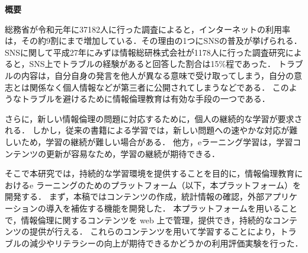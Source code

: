\begin{center}
{\bf \Large 概要}
\end{center}

総務省が令和元年に37182人に行った調査によると，インターネットの利用率は，その約9割にまで増加している\cite{soumu}．その理由の1つにSNSの普及が挙げられる．
SNSに関して平成27年にみずほ情報総研株式会社が1178人に行った調査研究\cite{mizuho}によると，SNS上でトラブルの経験があると回答した割合は15\%程であった．
トラブルの内容は，自分自身の発言を他人が異なる意味で受け取ってしまう，自分の意志とは関係なく個人情報などが第三者に公開されてしまうなどである．
このようなトラブルを避けるために情報倫理教育は有効な手段の一つである\cite{moraru}．

さらに，新しい情報倫理の問題に対応するために，個人の継続的な学習が要求される\cite{fluency}．
しかし，従来の書籍による学習では，新しい問題への速やかな対応が難しいため，学習の継続が難しい場合がある．
他方，eラーニング学習は，学習コンテンツの更新が容易なため，学習の継続が期待できる\cite{chieru}．

そこで本研究では，持続的な学習環境を提供することを目的に，情報倫理教育におけるe ラーニングのためのプラットフォーム（以下，本プラットフォーム）を開発する．
まず，本稿ではコンテンツの作成，統計情報の確認，外部アプリケーションの導入を補佐する機能を開発した．
本プラットフォームを用いることで，情報倫理に関するコンテンツを web 上で管理，提供でき，持続的なコンテンツの提供が行える．
これらのコンテンツを用いて学習することにより，トラブルの減少やリテラシーの向上が期待できるかどうかの利用評価実験を行った．

